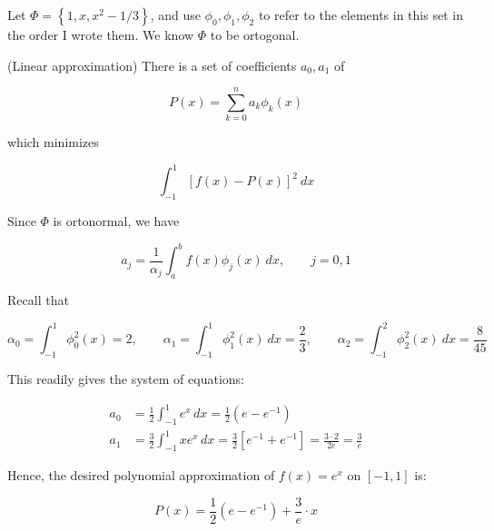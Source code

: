 \documentclass[12pt]{article}
\theoremstyle{definition}
\begin{document}
Let $\Phi = \left\{ 1, x, x^2 - 1 / 3 \right\} $, and use $\phi_0, \phi_1,
\phi_2$ to refer to the elements in this set in the order I wrote them. We know
$\Phi$ to be ortogonal. 

(Linear approximation) There is a set of coefficients $a_0, a_1$ of 

\begin{equation*}
    P(x) = \sum_{k=0}^n a_k \phi_k(x)
\end{equation*}

which minimizes 

\begin{equation*}
    \int_{-1}^1 \left[ f(x) - P(x) \right]^2 ~ dx
\end{equation*}

Since $\Phi$ is ortonormal, we have 

\begin{equation*}
    a_j = \frac{1}{\alpha_j} \int_a^b f(x) \phi_j(x) ~ dx, \qquad j = 0, 1
\end{equation*}

Recall that

\begin{equation*}
    \alpha_0 = \int_{-1}^1 \phi_0^2(x) = 2, \qquad \alpha_1 = \int_{-1}^1 \phi_1^2(x) ~ dx =
    \frac{2}{3}, \qquad \alpha_2 = \int_{-1}^2 \phi_2^2(x) ~ dx = \frac{8}{45}
\end{equation*}

This readily gives the system of equations: 


\begin{align*}
a_0 &= \frac{1}{2} \int_{-1}^1 e^x \, dx = \frac{1}{2}(e - e^{-1}) \\
a_1 &= \frac{3}{2} \int_{-1}^1 x e^x \, dx = \frac{3}{2} \left[ e^{-1} + e^{-1} \right] = \frac{3 \cdot 2}{2e} = \frac{3}{e}
\end{align*}


Hence, the desired polynomial approximation of $f(x) = e^x$  on $[-1, 1]$ is:


\begin{equation*}
P(x) = \frac{1}{2}(e - e^{-1}) + \frac{3}{e} \cdot x
\end{equation*}

\begin{center}
\end{center}
\end{document}
